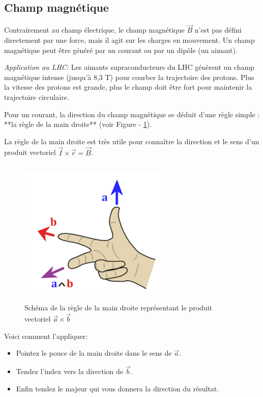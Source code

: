 \documentclass[14pt]{article}
\begin{document}
\subsection{Champ magnétique}\label{champB}



Contrairement au champ électrique, le champ magnétique $\vec{B}$ n'est pas défini directement par une force, mais il agit sur les charges en mouvement. 
Un champ magnétique peut être généré par un courant ou par un dipôle (un aimant).

\textit{Application au LHC:} Les aimants supraconducteurs du LHC génèrent un champ magnétique intense (jusqu'à 8,3 T) pour courber la trajectoire des protons. Plus la vitesse des protons est grande, plus le champ doit être fort pour maintenir la trajectoire circulaire.


Pour un courant, la direction du champ magnétique se déduit d’une règle simple : **la règle de la main droite** (voir Figure - \ref{fig:main}).  


La règle de la main droite est très utile pour connaître la direction et le sens d'un produit vectoriel $\vec{I} \times \vec{r} = \vec{B}$.

\begin{figure}[ht]
\includegraphics[width=200pt,height=200pt]{images.png}
\centering
\caption{Schéma de la règle de la main droite représentant le produit vectoriel $\vec{a} \times \vec{b}$ \cite{main}}
\label{fig:main}
\end{figure}

Voici comment l'appliquer:

\begin{itemize}
    \item Pointez le pouce de la main droite dans le sens de $\vec{a}$.
    \item Tendez l'index vers la direction de $\vec{b}$.
    \item Enfin tendez le majeur qui vous donnera la direction du résultat.
\end{itemize}
\end{document}
